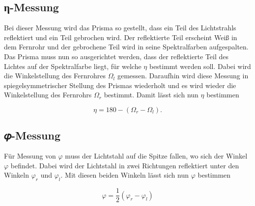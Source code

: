 \subsection{η-Messung}

Bei dieser Messung wird das Prisma so gestellt, dass ein Teil des Lichtstrahls
reflektiert und ein Teil gebrochen wird. Der reflektierte Teil erscheint Weiß
in dem Fernrohr und der gebrochene Teil wird in seine Spektralfarben aufgespalten.
Das Prisma muss nun so ausgerichtet werden, dass der reflektierte Teil des Lichtes
auf der Spektralfarbe liegt, für welche $\eta$ bestimmt werden soll. Dabei wird die
Winkelstellung des Fernrohres $\Omega_l$ gemessen. Daraufhin wird diese Messung in
spiegelsymmetrischer Stellung des Prismas wiederholt und es wird wieder die Winkelstellung
des Fernrohrs $\Omega_r$ bestimmt. Damit lässt sich nun $\eta$ bestimmen

\begin{equation}
  \eta = 180 - (\Omega_r - \Omega_l).
  \label{eq:6}
\end{equation}

\subsection{𝜑-Messung}

Für Messung von $\varphi$ muss der Lichtstahl auf die Spitze fallen, wo sich der Winkel
$\varphi$ befindet. Dabei wird der Lichtstahl in zwei Richtungen reflektiert unter den
Winkeln $\varphi_r$ und $\varphi_l$. Mit diesen beiden Winkeln lässt sich nun $\varphi$ bestimmen

\begin{equation}
  \varphi = \frac{1}{2}(\varphi_r - \varphi_l)
  \label{eq:7}
\end{equation}
